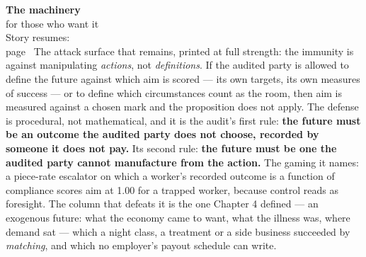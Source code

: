 \begin{machinery}{\textbf{The machinery}\\for those who want it\\[3pt]{\color{muted}Story resumes:\\page~\pageref{ch14}}}
The attack surface that remains, printed at full strength: the
immunity is against manipulating \emph{actions}, not \emph{definitions}. If the
audited party is allowed to define the future against which aim is
scored --- its own targets, its own measures of success --- or to define
which circumstances count as the room, then aim is measured against a
chosen mark and the proposition does not apply. The defense is
procedural, not mathematical, and it is the audit's first rule: \textbf{the
future must be an outcome the audited party does not choose, recorded
by someone it does not pay.} Its second rule: \textbf{the future must be one the audited party cannot
manufacture from the action.} The gaming it names: a piece-rate
escalator on which a worker's recorded outcome is a function of
compliance scores aim at 1.00 for a trapped worker, because control
reads as foresight. The column that defeats it is the one Chapter 4
defined --- an exogenous future: what the economy came to want, what the
illness was, where demand sat --- which a night class, a treatment or a
side business succeeded by \emph{matching}, and which no employer's payout
schedule can write.

\end{machinery}

